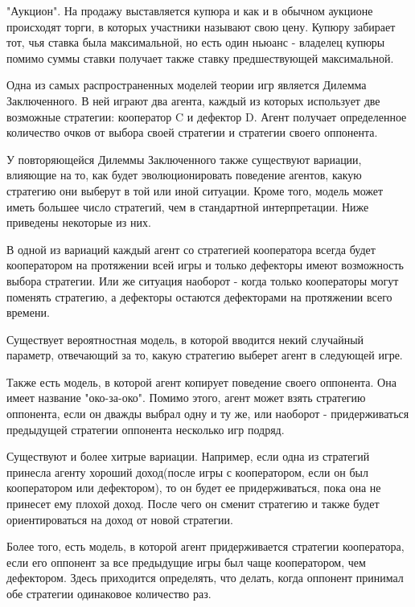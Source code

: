\documentclass[12pt,a4paper]{article}
\begin{document}
	\par "Аукцион". На продажу выставляется купюра и как и в обычном аукционе происходят торги, в которых участники называют свою цену. Купюру забирает тот, чья ставка была максимальной, но есть один ньюанс - владелец купюры помимо суммы ставки получает также ставку предшествующей максимальной. 
	
	\par Одна из самых распространенных моделей теории игр является Дилемма Заключенного.
	В ней играют два агента, каждый из которых использует две возможные стратегии: 
	кооператор C и дефектор D. Агент получает определенное количество очков от выбора
	своей стратегии и стратегии своего оппонента.
	
	\par У повторяющейся Дилеммы Заключенного также существуют вариации, влияющие на то, как будет эволюционировать поведение агентов, какую стратегию они выберут в той или иной ситуации. Кроме того, модель может иметь большее число стратегий, чем в стандартной интерпретации. Ниже приведены некоторые из них.
	
	\par В одной из вариаций каждый агент со стратегией кооператора всегда будет кооператором на протяжении всей игры и только дефекторы имеют возможность выбора стратегии. Или же ситуация наоборот - когда только кооператоры могут поменять стратегию, а дефекторы остаются дефекторами на протяжении всего времени. 
	
	\par Существует вероятностная модель, в которой вводится некий случайный параметр, отвечающий за то, какую стратегию выберет агент в следующей игре.
	
	\par Также есть модель, в которой агент копирует поведение своего оппонента. Она имеет название "око-за-око". Помимо этого, агент может взять стратегию оппонента, если он дважды выбрал одну и ту же, или наоборот - придерживаться предыдущей стратегии оппонента несколько игр подряд.
	
	\par Существуют и более хитрые вариации. Например, если одна из стратегий принесла агенту хороший доход(после игры с кооператором, если он был кооператором или дефектором), то он будет ее придерживаться, пока она не принесет ему плохой доход. После чего он сменит стратегию и также будет ориентироваться на доход от новой стратегии. 
	
	\par Более того, есть модель, в которой агент придерживается стратегии кооператора, если его оппонент за все предыдущие игры был чаще кооператором, чем дефектором. Здесь приходится определять, что делать, когда оппонент принимал обе стратегии одинаковое количество раз. 
	
\end{document}
